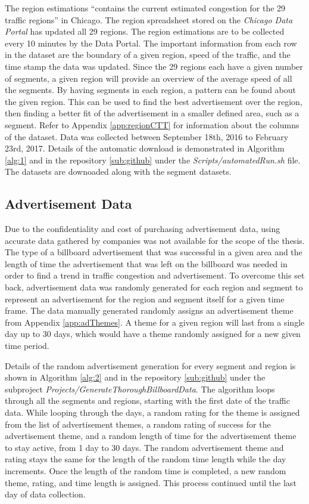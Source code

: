 \documentclass[titlepage,twocolumn]{article}
\begin{document}
\par The region estimations “contains the current estimated congestion for the 29 traffic regions” \cite{S3} in Chicago. The region spreadsheet stored on the \textit{Chicago Data Portal} has updated all 29 regions. The region estimations are to be collected every 10 minutes by the Data Portal. The important information from each row in the dataset are the boundary of a given region, speed of the traffic, and the time stamp the data was updated. Since the 29 regions each have a given number of segments, a given region will provide an overview of the average speed of all the segments. By having segments in each region, a pattern can be found about the given region. This can be used to find the best advertisement over the region, then finding a better fit of the advertisement in a smaller defined area, such as a segment. Refer to Appendix \ref{app:regionCTT} for information about the columns of the dataset. Data was collected between September 18th, 2016 to February 23rd, 2017. Details of the automatic download is demonstrated in Algorithm \ref{alg:1} and in the repository \ref{sub:github} under the \textit{Scripts/automatedRun.sh} file. The datasets are downoaded along with the segment datasets.

\subsection{Advertisement Data}
\label{sub:adData}

\par Due to the confidentiality and cost of purchasing advertisement data, using accurate data gathered by companies was not available for the scope of the thesis. The type of a billboard advertisement that was successful in a given area and the length of time the advertisement that was left on the billboard was needed in order to find a trend in traffic congestion and advertisement. To overcome this set back, advertisement data was randomly generated for each region and segment to represent an advertisement for the region and segment itself for a given time frame. The data manually generated randomly assigns an advertisement theme from Appendix \ref{app:adThemes}. A theme for a given region will last from a single day up to 30 days, which would have a theme randomly assigned for a new given time period. 
\par Details of the random advertisement generation for every segment and region is shown in Algorithm \ref{alg:2} and in the repository \ref{sub:github} under the subproject \textit{Projects/GenerateThoroughBillboardData}. The algorithm loops through all the segments and regions, starting with the first date of the traffic data. While looping through the days, a random rating for the theme is assigned from the list of advertisement themes, a random rating of success for the advertisement theme, and a random length of time for the advertisement theme to stay active, from 1 day to 30 days. The random advertisement theme and rating stays the same for the length of the random time length while the day increments. Once the length of the random time is completed, a new random theme, rating, and time length is assigned. This process continued until the last day of data collection. 
\end{document}
